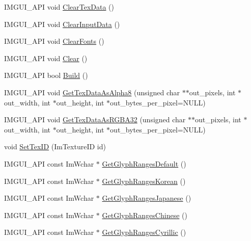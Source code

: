 \begin{DoxyCompactItemize}
\item 
I\+M\+G\+U\+I\+\_\+\+A\+PI void \hyperlink{struct_im_font_atlas_a3ede4bd513bec044c77ac392ad9c6e86}{Clear\+Tex\+Data} ()
\item 
I\+M\+G\+U\+I\+\_\+\+A\+PI void \hyperlink{struct_im_font_atlas_a3f5bcbb7a2683b1af106fcf4e1217662}{Clear\+Input\+Data} ()
\item 
I\+M\+G\+U\+I\+\_\+\+A\+PI void \hyperlink{struct_im_font_atlas_ad5c2560d708bd0c389e9bd9da2d9b055}{Clear\+Fonts} ()
\item 
I\+M\+G\+U\+I\+\_\+\+A\+PI void \hyperlink{struct_im_font_atlas_a8f6d01c671d8670f991ba651bbaf7e77}{Clear} ()
\item 
I\+M\+G\+U\+I\+\_\+\+A\+PI bool \hyperlink{struct_im_font_atlas_a81e39e30dffa4dd7e458a53297451e27}{Build} ()
\item 
I\+M\+G\+U\+I\+\_\+\+A\+PI void \hyperlink{struct_im_font_atlas_aeff1a1044a1ab68d8f27bb2819cd9f44}{Get\+Tex\+Data\+As\+Alpha8} (unsigned char $\ast$$\ast$out\+\_\+pixels, int $\ast$out\+\_\+width, int $\ast$out\+\_\+height, int $\ast$out\+\_\+bytes\+\_\+per\+\_\+pixel=N\+U\+LL)
\item 
I\+M\+G\+U\+I\+\_\+\+A\+PI void \hyperlink{struct_im_font_atlas_a8abb0c4e67ebb38249d4df71218c4eec}{Get\+Tex\+Data\+As\+R\+G\+B\+A32} (unsigned char $\ast$$\ast$out\+\_\+pixels, int $\ast$out\+\_\+width, int $\ast$out\+\_\+height, int $\ast$out\+\_\+bytes\+\_\+per\+\_\+pixel=N\+U\+LL)
\item 
void \hyperlink{struct_im_font_atlas_a96ffd1956c11dac4f79b43c095828445}{Set\+Tex\+ID} (Im\+Texture\+ID id)
\item 
I\+M\+G\+U\+I\+\_\+\+A\+PI const Im\+Wchar $\ast$ \hyperlink{struct_im_font_atlas_adec0df140eb1dc01c2a22a5253d62820}{Get\+Glyph\+Ranges\+Default} ()
\item 
I\+M\+G\+U\+I\+\_\+\+A\+PI const Im\+Wchar $\ast$ \hyperlink{struct_im_font_atlas_ac70e07bd35913661c8fc50413b3bf969}{Get\+Glyph\+Ranges\+Korean} ()
\item 
I\+M\+G\+U\+I\+\_\+\+A\+PI const Im\+Wchar $\ast$ \hyperlink{struct_im_font_atlas_a2654afbbf73835bf08278cdc6c181a96}{Get\+Glyph\+Ranges\+Japanese} ()
\item 
I\+M\+G\+U\+I\+\_\+\+A\+PI const Im\+Wchar $\ast$ \hyperlink{struct_im_font_atlas_afc5807dd42b3a644a9a1e0a95c13cb08}{Get\+Glyph\+Ranges\+Chinese} ()
\item 
I\+M\+G\+U\+I\+\_\+\+A\+PI const Im\+Wchar $\ast$ \hyperlink{struct_im_font_atlas_a5aaff3357d9ed401ce451c39942e869e}{Get\+Glyph\+Ranges\+Cyrillic} ()

\end{DoxyCompactItemize}

